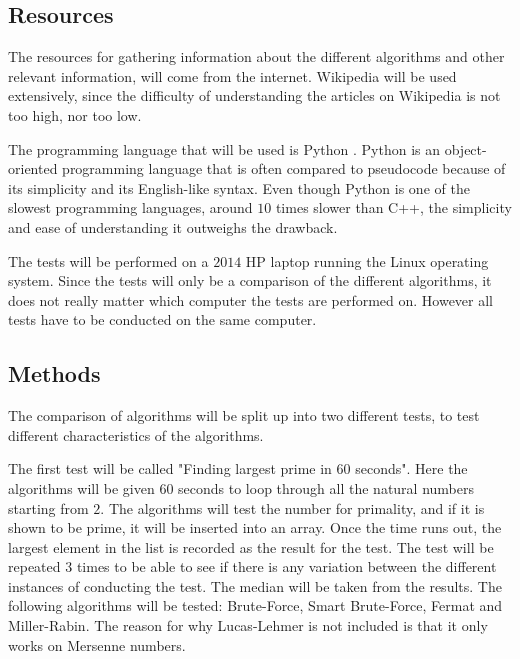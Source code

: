 \documentclass[main.tex]{subfiles}
\begin{document}
\subsection{Resources}
The resources for gathering information about the different algorithms and other
relevant information, will come from the internet. Wikipedia \cite{wikipedia}
will be used extensively, since the difficulty of understanding the articles on
Wikipedia is not too high, nor too low. \newline

The programming language that will be used is Python \cite{python}. Python is an
object-oriented programming language that is often compared to pseudocode
because of its simplicity and its English-like syntax. Even though Python is one
of the slowest programming languages, around $10$ times slower than C++, the
simplicity and ease of understanding it outweighs the drawback. \newline

The tests will be performed on a $2014$ HP laptop running the Linux operating
system. Since the tests will only be a comparison of the different algorithms,
it does not really matter which computer the tests are performed on. However all
tests have to be conducted on the same computer.

\subsection{Methods}
The comparison of algorithms will be split up into two different tests, to test
different characteristics of the algorithms. \newline

The first test will be called "Finding largest prime in $60$ seconds". Here the
algorithms will be given $60$ seconds to loop through all the natural numbers
starting from $2$. The algorithms will test the number for primality, and if it
is shown to be prime, it will be inserted into an array. Once the time runs out,
the largest element in the list is recorded as the result for the test. The test
will be repeated $3$ times to be able to see if there is any variation between
the different instances of conducting the test. The median will be taken from
the results. The following algorithms will be tested: Brute-Force, Smart
Brute-Force, Fermat and Miller-Rabin. The reason for why Lucas-Lehmer is not
included is that it only works on Mersenne numbers. \newline
\end{document}
